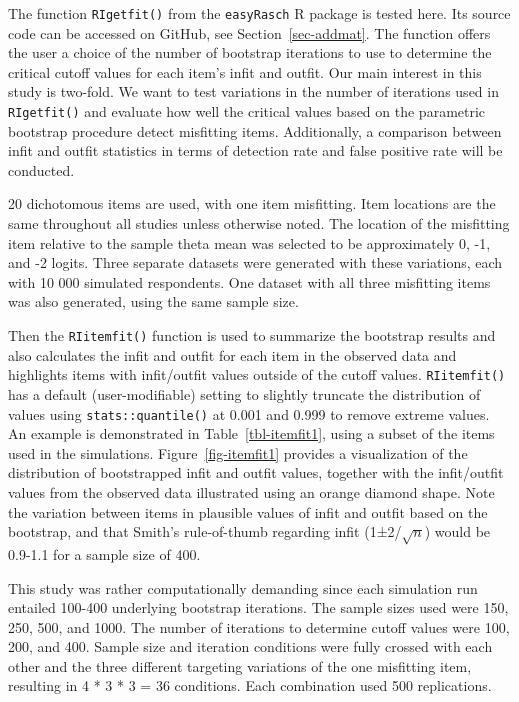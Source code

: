 \documentclass[
  letterpaper,
  DIV=11,
  numbers=noendperiod]{scrartcl}
\begin{document}
The function \texttt{RIgetfit()} from the \texttt{easyRasch} R package
is tested here. Its source code can be accessed on GitHub, see
Section~\ref{sec-addmat}. The function offers the user a choice of the
number of bootstrap iterations to use to determine the critical cutoff
values for each item's infit and outfit. Our main interest in this study
is two-fold. We want to test variations in the number of iterations used
in \texttt{RIgetfit()} and evaluate how well the critical values based
on the parametric bootstrap procedure detect misfitting items.
Additionally, a comparison between infit and outfit statistics in terms
of detection rate and false positive rate will be conducted.

20 dichotomous items are used, with one item misfitting. Item locations
are the same throughout all studies unless otherwise noted. The location
of the misfitting item relative to the sample theta mean was selected to
be approximately 0, -1, and -2 logits. Three separate datasets were
generated with these variations, each with 10 000 simulated respondents.
One dataset with all three misfitting items was also generated, using
the same sample size.

Then the \texttt{RIitemfit()} function is used to summarize the
bootstrap results and also calculates the infit and outfit for each item
in the observed data and highlights items with infit/outfit values
outside of the cutoff values. \texttt{RIitemfit()} has a default
(user-modifiable) setting to slightly truncate the distribution of
values using \texttt{stats::quantile()} at 0.001 and 0.999 to remove
extreme values. An example is demonstrated in Table~\ref{tbl-itemfit1},
using a subset of the items used in the simulations.
Figure~\ref{fig-itemfit1} provides a visualization of the distribution
of bootstrapped infit and outfit values, together with the infit/outfit
values from the observed data illustrated using an orange diamond shape.
Note the variation between items in plausible values of infit and outfit
based on the bootstrap, and that Smith's rule-of-thumb regarding infit
(1±2/\(\sqrt{n}\)) would be 0.9-1.1 for a sample size of 400.

This study was rather computationally demanding since each simulation
run entailed 100-400 underlying bootstrap iterations. The sample sizes
used were 150, 250, 500, and 1000. The number of iterations to determine
cutoff values were 100, 200, and 400. Sample size and iteration
conditions were fully crossed with each other and the three different
targeting variations of the one misfitting item, resulting in 4 * 3 * 3
= 36 conditions. Each combination used 500 replications.
\end{document}
